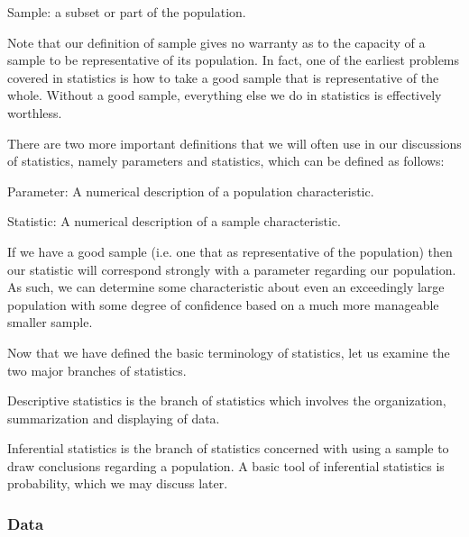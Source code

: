 \begin{definition} 
Sample: a subset or part of the population.
\end{definition} 

Note that our definition of sample gives no warranty as to the capacity of a sample to be representative of its population. In fact, one of the earliest problems covered in statistics is how to take a good sample that is representative of the whole. Without a good sample, everything else we do in statistics is effectively worthless.\newline

There are two more important definitions that we will often use in our discussions of statistics, namely parameters and statistics, which can be defined as follows:

\begin{definition}
Parameter: A numerical description of a population characteristic.
\end{definition} 

\begin{definition}
Statistic: A numerical description of a sample characteristic.
\end{definition} 

If we have a good sample (i.e. one that as representative of the population) then our statistic will correspond strongly with a parameter regarding our population. As such, we can determine some characteristic about even an exceedingly large population with some degree of confidence based on a much more manageable smaller sample.\newline

Now that we have defined the basic terminology of statistics, let us examine the two major branches of statistics.\newline

Descriptive statistics is the branch of statistics which involves the organization, summarization and displaying of data.\newline

Inferential statistics is the branch of statistics concerned with using a sample to draw conclusions regarding a population. A basic tool of inferential statistics is probability, which we may discuss later. \newline

\subsubsection{Data}

